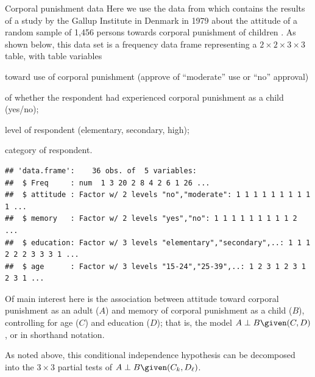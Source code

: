 \documentclass[11pt]{book}
\renewenvironment{knitrout}{\small\renewcommand{\baselinestretch}{.85}}{} %
\begin{document}
\begin{Example}[punish]{Corporal punishment data}
Here we use the  data from 
which contains the results of
a study by the Gallup Institute in Denmark in 1979 about the attitude of a random sample of 1,456 persons towards corporal punishment of children \citep[pp. 207-208]{Andersen:91}.
As shown below, this data set is a frequency data frame representing a
$2 \times 2 \times 3 \times 3$ table, with table variables
\begin{seriate}
 \item {} toward use of corporal punishment (approve of ``moderate'' use or ``no'' approval)
 \item {} of whether the respondent had experienced corporal punishment as a child (yes/no);
 \item {} level of respondent (elementary, secondary, high);
 \item {} category of respondent.
\end{seriate}
\begin{knitrout}\footnotesize
{}\color{fgcolor}\begin{kframe}
\begin{alltt}
\hlstd{(}\hlstd{,}  \hlstd{=} \hlstd{)}
\end{alltt}
\begin{verbatim}
## 'data.frame':	36 obs. of  5 variables:
##  $ Freq     : num  1 3 20 2 8 4 2 6 1 26 ...
##  $ attitude : Factor w/ 2 levels "no","moderate": 1 1 1 1 1 1 1 1 1 1 ...
##  $ memory   : Factor w/ 2 levels "yes","no": 1 1 1 1 1 1 1 1 1 2 ...
##  $ education: Factor w/ 3 levels "elementary","secondary",..: 1 1 1 2 2 2 3 3 3 1 ...
##  $ age      : Factor w/ 3 levels "15-24","25-39",..: 1 2 3 1 2 3 1 2 3 1 ...
\end{verbatim}
\end{kframe}
\end{knitrout}
Of main interest here is the association between attitude toward corporal punishment as an adult ($A$)
and memory of corporal punishment as a child ($B$), 
controlling for age ($C$) and education ($D$); that is, the model $A \perp B \given (C,D)$,
or  in shorthand notation.

As noted above, this conditional independence
hypothesis can be decomposed into the $3 \times 3$ partial tests of
$A \perp B \given (C_k,D_\ell)$.


\end{Example}
\end{document}
